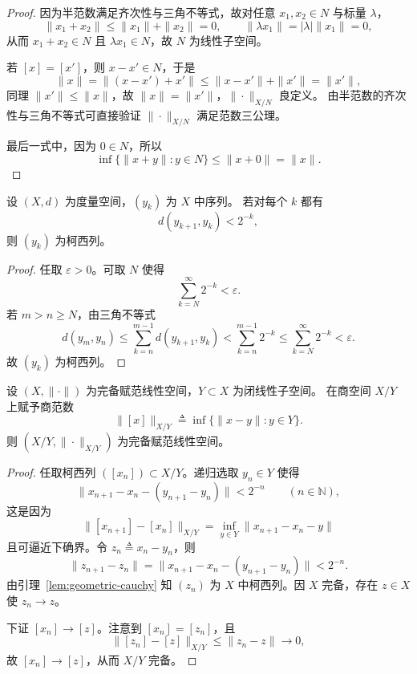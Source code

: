 \documentclass[lang=cn,a4paper,newtx,section]{elegantbook}
\begin{document}
\begin{proof}
  因为半范数满足齐次性与三角不等式，故对任意 $x_1,x_2\in N$ 与标量 $\lambda$，
  \[
    \|x_1+x_2\|\le \|x_1\|+\|x_2\|=0,\qquad \|\lambda x_1\|=|\lambda|\|x_1\|=0,
  \]
  从而 $x_1+x_2\in N$ 且 $\lambda x_1\in N$，故 $N$ 为线性子空间。

  若 $[x]=[x']$，则 $x-x'\in N$，于是
  \[
    \|x\|=\|(x-x')+x'\|\le \|x-x'\|+\|x'\|=\|x'\|,
  \]
  同理 $\|x'\|\le \|x\|$，故 $\|x\|=\|x'\|，\|\cdot\|_{X/N}$ 良定义。
  由半范数的齐次性与三角不等式可直接验证 $\|\cdot\|_{X/N}$ 满足范数三公理。

  最后一式中，因为 $0\in N$，所以
  \[
    \inf\{\|x+y\|:y\in N\}\le \|x+0\|=\|x\|.
  \]
\end{proof}
\begin{lemma}\label{lem:geometric-cauchy}
  设 $(X,d)$ 为度量空间，$(y_k)$ 为 $X$ 中序列。
  若对每个 $k$ 都有
  \[
    d(y_{k+1},y_k)<2^{-k},
  \]
  则 $(y_k)$ 为柯西列。
\end{lemma}

\begin{proof}
  任取 $\varepsilon>0$。可取 $N$ 使得
  \[
    \sum_{k=N}^{\infty}2^{-k}<\varepsilon.
  \]
  若 $m>n\ge N$，由三角不等式
  \[
    d(y_m,y_n)\le \sum_{k=n}^{m-1}d(y_{k+1},y_k)<\sum_{k=n}^{m-1}2^{-k}\le \sum_{k=N}^{\infty}2^{-k}<\varepsilon.
  \]
  故 $(y_k)$ 为柯西列。
\end{proof}
\begin{theorem}
  设 $(X,\|\cdot\|)$ 为完备赋范线性空间，$Y\subset X$ 为闭线性子空间。
  在商空间 $X/Y$ 上赋予商范数
  \[
    \|[x]\|_{X/Y}\triangleq \inf\{\|x-y\|:y\in Y\}.
  \]
  则 $(X/Y,\|\cdot\|_{X/Y})$ 为完备赋范线性空间。
\end{theorem}

\begin{proof}
  任取柯西列 $([x_n])\subset X/Y$。递归选取 $y_n\in Y$ 使得
  \[
    \|x_{n+1}-x_n-(y_{n+1}-y_n)\|<2^{-n}\qquad(n\in\mathbb{N}),
  \]
  这是因为
  \[
    \|[x_{n+1}]-[x_n]\|_{X/Y}=\inf_{y\in Y}\|x_{n+1}-x_n-y\|
  \]
  且可逼近下确界。令 $z_n\triangleq x_n-y_n$，则
  \[
    \|z_{n+1}-z_n\|=\|x_{n+1}-x_n-(y_{n+1}-y_n)\|<2^{-n}.
  \]
  由引理~\ref{lem:geometric-cauchy} 知 $(z_n)$ 为 $X$ 中柯西列。因 $X$ 完备，存在 $z\in X$ 使 $z_n\to z$。

  下证 $[x_n]\to [z]$。注意到 $[x_n]=[z_n]$，且
  \[
    \|[z_n]-[z]\|_{X/Y}\le \|z_n-z\|\to 0,
  \]
  故 $[x_n]\to [z]$，从而 $X/Y$ 完备。
\end{proof}
\end{document}
